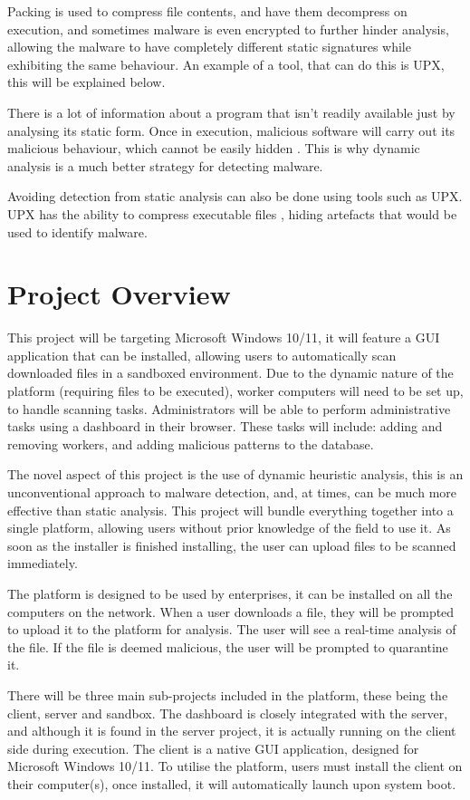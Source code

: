Packing is used to compress file contents, and have them decompress on execution,
and sometimes malware is even encrypted to further hinder analysis,
allowing the malware to have completely different
static signatures while exhibiting the same behaviour.
An example of a tool, that can do this is UPX, this will be explained below.

There is a lot of information about a program that isn't
readily available just by analysing its static form.
Once in execution, malicious software will carry out its malicious behaviour,
which cannot be easily hidden \cite{10.1145/3329786}.
This is why dynamic analysis is a much better strategy for detecting malware.

Avoiding detection from static analysis can also be done using tools such as UPX.
UPX has the ability to compress executable files \cite{upx},
hiding artefacts that would be used to identify malware.

\section{Project Overview}
This project will be targeting Microsoft Windows 10/11,
it will feature a GUI application that can be installed,
allowing users to automatically scan downloaded files in a sandboxed environment.
Due to the dynamic nature of the platform (requiring files to be executed),
worker computers will need to be set up, to handle scanning tasks.
Administrators will be able to perform administrative
tasks using a dashboard in their browser.
These tasks will include: adding and removing workers,
and adding malicious patterns to the database.

The novel aspect of this project is the use of dynamic heuristic analysis,
this is an unconventional approach to malware detection,
and, at times, can be much more effective than static analysis.
This project will bundle everything together into a single platform,
allowing users without prior knowledge of the field to use it.
As soon as the installer is finished installing,
the user can upload files to be scanned immediately.

The platform is designed to be used by enterprises,
it can be installed on all the computers on the network.
When a user downloads a file, they will be prompted to
upload it to the platform for analysis.
The user will see a real-time analysis of the file.
If the file is deemed malicious, the user will be prompted to quarantine it.

There will be three main sub-projects included in the platform,
these being the client, server and sandbox.
The dashboard is closely integrated with the server,
and although it is found in the server project,
it is actually running on the client side during execution.
The client is a native GUI application,
designed for Microsoft Windows 10/11.
To utilise the platform, users must install the client on their computer(s),
once installed, it will automatically launch upon system boot.

